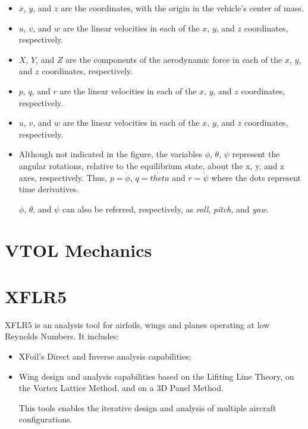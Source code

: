 \begin{itemize}

\item $x$, $y$, and $z$ are the coordinates, with the origin in the vehicle's center of mass.
\item $u$, $v$, and $w$ are the linear velocities in each of the $x$, $y$, and $z$ coordinates, respectively.
\item $X$, $Y$, and $Z$ are the components of the aerodynamic force in each of the $x$, $y$, and $z$ coordinates, respectively.
\item $p$, $q$, and $r$ are the linear velocities in each of the $x$, $y$, and $z$ coordinates, respectively.
\item $u$, $v$, and $w$ are the linear velocities in each of the $x$, $y$, and $z$ coordinates, respectively.
\item  Although not indicated in the figure, the variables $\phi$, $\theta$, $\psi$ represent the angular rotations,
relative to the equilibrium state, about the x, y, and z axes, respectively. Thus, $p=\dot{\phi}$, $q = \dot{theta}$
and $r = \dot{\psi}$ where the dots represent time derivatives.

$\phi$, $\theta$, and $\psi$ can also be referred, respectively, as \textit{roll}, \textit{pitch}, and \textit{yaw}.

\end{itemize}

\section{VTOL Mechanics}

\section{XFLR5}

XFLR5 is an analysis tool for airfoils, wings and planes operating at low Reynolds Numbers. It includes:
\begin{itemize}

\item XFoil's Direct and Inverse analysis capabilities;
\item Wing design and analysis capabilities based on the Lifiting Line Theory, on the Vortex Lattice Method, and on a 3D Panel Method.

This tools enables the iterative design and analysis of multiple aircraft configurations.


\end{itemize}


